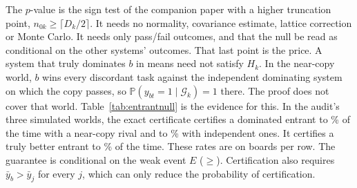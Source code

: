 \documentclass[11pt]{article}
\renewcommand{\Pr}{\mathbb{P}}
\begin{document}
The $p$-value is the sign test of the companion paper with a higher truncation point, $n_{0k}\ge\lceil D_k/2\rceil$. It needs no normality, covariance estimate, lattice correction or Monte Carlo. It needs only pass/fail outcomes, and that the null be read as conditional on the other systems' outcomes. That last point is the price. A system that truly dominates $b$ in means need not satisfy $H_k$. In the near-copy world, $b$ wins every discordant task against the independent dominating system on which the copy passes, so $\Pr(y_{bt}=1\mid\mathcal G_k)=1$ there. The proof does not cover that world. Table~\ref{tab:entrantnull} is the evidence for this. In the audit's three simulated worlds, the exact certificate certifies a dominated entrant \NumEntrantNullExCopyMin{} to \NumEntrantNullExCopyMax\% of the time with a near-copy rival and \NumEntrantNullExIndepMin{} to \NumEntrantNullExIndepMax\% with independent ones. It certifies a truly better entrant \NumEntrantPowerExMin{} to \NumEntrantPowerExMax\% of the time. These rates are on \NumEntrantNullRExact{} boards per row. The guarantee is conditional on the weak event $E$ ($\ge$). Certification also requires $\bar y_b>\bar y_j$ for every $j$, which can only reduce the probability of certification.
\end{document}
